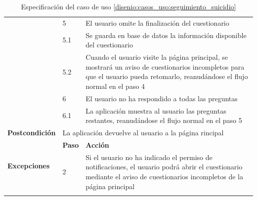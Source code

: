 \begin{table}[h]
\begin{tabularx}{\textwidth}{|l|l|X|}
                    \cline{2-3} & 5 & El usuario omite la finalización del cuestionario \\
                    \cline{2-3} & 5.1 & Se guarda en base de datos la información disponible del cuestionario \\
                    \cline{2-3} & 5.2 & Cuando el usuario visite la página principal, se mostrará un aviso de cuestionarios incompletos para que el usuario pueda retomarlo, reanudándose el flujo normal en el paso 4 \\
                    \cline{2-3} & 6 & El usuario no ha respondido a todas las preguntas \\
                    \cline{2-3} & 6.1 & La aplicación muestra al usuario las preguntas restantes, reanudándose el flujo normal en el paso 5 \\
                    \hline
                    \textbf{Postcondición} & \multicolumn{2}{|X|}{La aplicación devuelve al usuario a la página rincipal} \\
                    \hline
                    \multirow{2}{*}{\textbf{Excepciones}}  & \textbf{Paso} & \textbf{Acción} \\
                    \cline{2-3} & 2 & Si el usuario no ha indicado el permiso de notificaciones, el usuario podrá abrir el cuestionario mediante el aviso de cuestionarios incompletos de la página principal \\
                    \hline
                    \caption{Especificación del caso de uso \ref{disenio:casos_uso:seguimiento_suicidio}}
                    \label{tabla:casos_uso:seguimiento_suicidio}
                \end{tabularx}
            \end{table}

